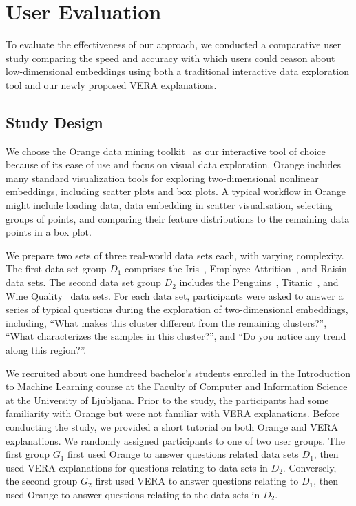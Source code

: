 \documentclass[lettersize,journal]{IEEEtran}
\begin{document}
\section{User Evaluation}
\label{sec:user-study}

To evaluate the effectiveness of our approach, we conducted a comparative user study comparing the speed and accuracy with which users could reason about low-dimensional embeddings using both a traditional interactive data exploration tool and our newly proposed VERA explanations.

\subsection{Study Design}

We choose the Orange data mining toolkit~\cite{Demsar2013} as our interactive tool of choice because of its ease of use and focus on visual data exploration. Orange includes many standard visualization tools for exploring two-dimensional nonlinear embeddings, including scatter plots and box plots. A typical workflow in Orange might include loading data, data embedding in scatter visualisation, selecting groups of points, and comparing their feature distributions to the remaining data points in a box plot.

We prepare two sets of three real-world data sets each, with varying complexity.
The first data set group $D_1$ comprises the Iris~\cite{Anderson1936}, Employee Attrition~\cite{IbmEmployeeAttrition}, and Raisin~\cite{RaisinDataset} data sets. The second data set group $D_2$ includes the Penguins~\cite{Horst2020}, Titanic~\cite{Dawson1995}, and Wine Quality~\cite{Cortez2009} data sets. For each data set, participants were asked to answer a series of typical questions during the exploration of two-dimensional embeddings, including, ``What makes this cluster different from the remaining clusters?'', ``What characterizes the samples in this cluster?'', and ``Do you notice any trend along this region?''.

We recruited about one hundreed bachelor's students enrolled in the Introduction to Machine Learning course at the Faculty of Computer and Information Science at the University of Ljubljana.
Prior to the study, the participants had some familiarity with Orange but were not familiar with VERA explanations. Before conducting the study, we provided a short tutorial on both Orange and VERA explanations.
We randomly assigned participants to one of two user groups. The first group $G_1$ first used Orange to answer questions related data sets $D_1$, then used VERA explanations for questions relating to data sets in $D_2$. Conversely, the second group $G_2$ first used VERA to answer questions relating to $D_1$, then used Orange to answer questions relating to the data sets in $D_2$.
\end{document}

